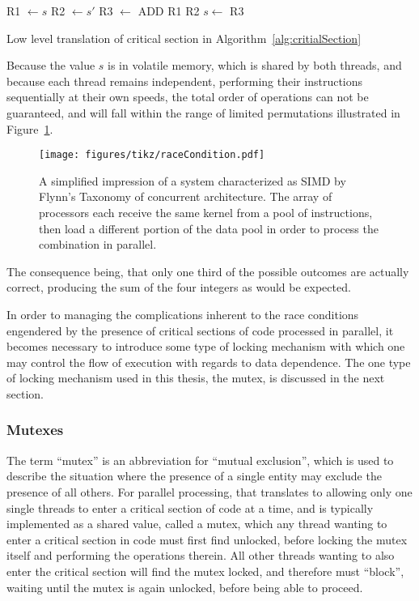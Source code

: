 \begin{algorithm}[ht]
	\DontPrintSemicolon
\nl	R1 $\leftarrow s$\;
\nl	R2 $\leftarrow s'$\;
\nl R3 $\leftarrow$ ADD R1 R2\;
\nl	$s \leftarrow$ R3\;
	\caption{Low level translation of critical section in Algorithm~\ref{alg:critialSection} \label{alg:critialSectionLowLevel}}
\end{algorithm}%

Because the value $s$ is in volatile memory, which is shared by both threads, and because each thread remains independent, performing their instructions sequentially at their own speeds, the total order of operations can not be guaranteed, and will fall within the range of limited permutations illustrated in Figure~\ref{fig:raceCondition}.

\begin{figure}[ht]
\ffigbox
	{\texttt{[image: figures/tikz/raceCondition.pdf]}}
	{\caption[SIMD Architecture]{A simplified impression of a system characterized as SIMD by Flynn's Taxonomy of concurrent architecture. The array of processors each receive the same kernel from a pool of instructions, then load a different portion of the data pool in order to process the combination in parallel.}\label{fig:raceCondition}}
\end{figure} The consequence being, that only one third of the possible outcomes are actually correct, producing the sum of the four integers as would be expected.

In order to managing the complications inherent to the race conditions engendered by the presence of critical sections of code processed in parallel, it becomes necessary to introduce some type of locking mechanism with which one may control the flow of execution with regards to data dependence. The one type of locking mechanism used in this thesis, the mutex, is discussed in the next section.

%
%
\subsubsection{Mutexes}
The term ``mutex'' is an abbreviation for ``mutual exclusion'', which is used to describe the situation where the presence of a single entity may exclude the presence of all others. For parallel processing, that translates to allowing only one single threads to enter a critical section of code at a time, and is typically implemented as a shared value, called a mutex, which any thread wanting to enter a critical section in code must first find unlocked, before locking the mutex itself and performing the operations therein. All other threads wanting to also enter the critical section will find the mutex locked, and therefore must ``block'', waiting until the mutex is again unlocked, before being able to proceed.

